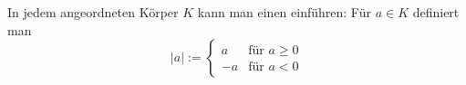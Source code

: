 In jedem angeordneten Körper $K$ kann man einen  einführen: Für $a \in K$ definiert man
$$|a| := \begin{cases} 
a & \text{für $a \geq 0$}\\ 
-a & \text{für $a < 0$}
\end{cases}
$$